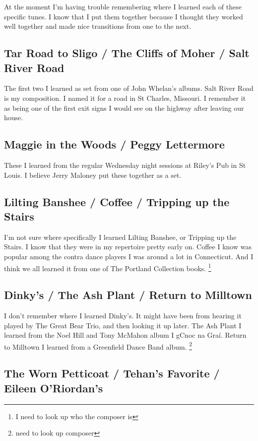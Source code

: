 \documentclass[11pt,letterpaper]{article}
\begin{document}
At the moment I'm having trouble remembering where I learned each of these specific tunes. I know that I put them together because I thought they worked well together and made nice transitions from one to the next. 

\subsection*{Tar Road to Sligo / The Cliffs of Moher / Salt River Road}

The first two I learned as set from one of John Whelan's albums. Salt River Road is my composition. I named it for a road in St Charles, Missouri. I remember it as being one of the first exit signs I would see on the highway after leaving our house. 

\subsection*{Maggie in the Woods / Peggy Lettermore}

These I learned from the regular Wednesday night sessions at Riley's Pub in St Louis. I believe Jerry Maloney put these together as a set. 

\subsection*{Lilting Banshee / Coffee / Tripping up the Stairs}

I'm not sure where specifically I learned Lilting Banshee, or Tripping up the Stairs. I know that they were in my repertoire pretty early on. Coffee I know was popular among the contra dance players I was around a lot in Connecticut. And I think we all learned it from one of The Portland Collection books. \footnote{I need to look up who the composer is}

\subsection*{Dinky's / The Ash Plant / Return to Milltown}

I don't remember where I learned Dinky's. It might have been from hearing it played by The Great Bear Trio, and then looking it up later. The Ash Plant I learned from the Noel Hill and Tony McMahon album I gCnoc na Graí. Return to Milltown I learned from a Greenfield Dance Band album. \footnote{need to look up composer}

\subsection*{The Worn Petticoat / Tehan's Favorite / Eileen O'Riordan's}
\end{document}
